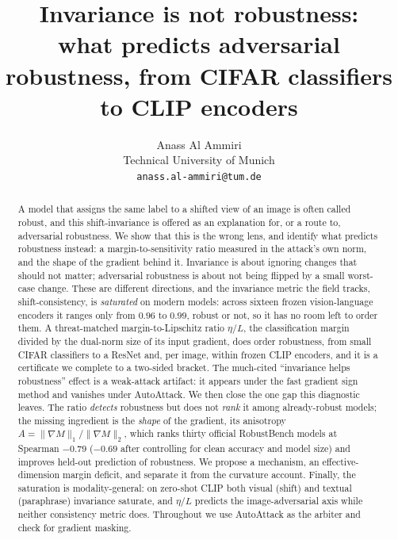 \documentclass{article}
\title{Invariance is not robustness:\\ what predicts adversarial robustness,
from CIFAR classifiers to CLIP encoders}
\author{%
  Anass Al Ammiri \\
  Technical University of Munich \\
  \texttt{anass.al-ammiri@tum.de} \\
}
\theoremstyle{definition}
\newcommand{\etaL}{\eta/L}
\newcommand{\grad}{\nabla}
\begin{document}
\maketitle

\begin{abstract}
A model that assigns the same label to a shifted view of an image is often called robust, and this
shift-invariance is offered as an explanation for, or a route to, adversarial robustness. We show that
this is the wrong lens, and identify what predicts robustness instead: a margin-to-sensitivity ratio
measured in the attack's own norm, and the shape of the gradient behind it. Invariance is about ignoring changes
that should not matter; adversarial robustness is about not being flipped by a small worst-case change.
These are different directions, and the invariance metric the field tracks, shift-consistency, is
\emph{saturated} on modern models: across sixteen frozen vision-language encoders it ranges only from
$0.96$ to $0.99$, robust or not, so it has no room left to order them. A threat-matched
margin-to-Lipschitz ratio $\etaL$, the classification margin divided by the dual-norm size of its input
gradient, does order robustness, from small CIFAR classifiers to a ResNet and, per image, within frozen
CLIP encoders, and it is a certificate we complete to a two-sided bracket. The much-cited ``invariance helps robustness''
effect is a weak-attack artifact: it appears under the fast gradient sign method and vanishes under
AutoAttack. We then close the one gap this diagnostic leaves. The ratio \emph{detects} robustness but
does not \emph{rank} it among already-robust models; the missing ingredient is the \emph{shape} of the
gradient, its anisotropy $A=\lVert\grad M\rVert_1/\lVert\grad M\rVert_2$, which ranks thirty official
RobustBench models at Spearman $-0.79$ ($-0.69$ after controlling for clean accuracy and model size) and
improves held-out prediction of robustness. We propose a mechanism, an effective-dimension margin
deficit, and separate it from the curvature account. Finally, the
saturation is modality-general: on zero-shot CLIP both visual (shift) and textual (paraphrase) invariance
saturate, and $\etaL$ predicts the image-adversarial axis while neither consistency metric does. Throughout we use
AutoAttack as the arbiter and check for gradient masking.
\end{abstract}

\end{document}
